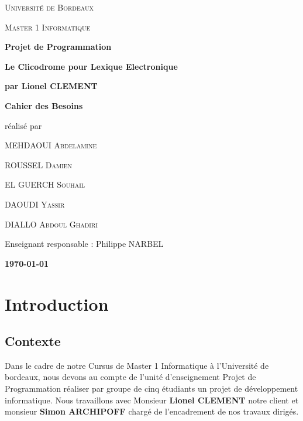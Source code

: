 \documentclass[a4paper, 12pt]{article}
\begin{document}
\begin{titlepage}
\centering
{\scshape\LARGE Université de Bordeaux \par}
{\scshape\Large Master 1 Informatique  \par}
\vspace{2cm}

{\Huge\bfseries Projet de Programmation\par}
\vspace{2cm}
{\Huge\bfseries Le Clicodrome pour Lexique Electronique \par}
\vspace{1cm}
{\Large\bfseries par Lionel CLEMENT \par}
\vspace{3cm}
{\Large\bfseries Cahier des Besoins\par}

\vspace{1cm}
réalisé par \par
MEHDAOUI  \textsc{Abdelamine} \par
ROUSSEL  \textsc{Damien} \par
EL GUERCH  \textsc{Souhail} \par
DAOUDI \textsc{Yassir } \par
DIALLO  \textsc{Abdoul Ghadiri} \par

\vspace{3cm}
{\large Enseignant responsable : Philippe NARBEL \par}
\vspace{0.5cm}
{\large\bfseries \today\par}

\end{titlepage}
	

\newpage
\tableofcontents

\newpage\section{Introduction}
\subsection{Contexte}
Dans le cadre de notre Cursus de Master 1 Informatique à l'Université de bordeaux, nous devons au compte de l'unité d'enseignement Projet de Programmation réaliser par groupe de cinq étudiants un projet de développement informatique. Nous travaillons avec Monsieur \textbf{Lionel CLEMENT} notre client et monsieur \textbf{Simon ARCHIPOFF} chargé de l'encadrement de nos travaux dirigés.
\end{document}
